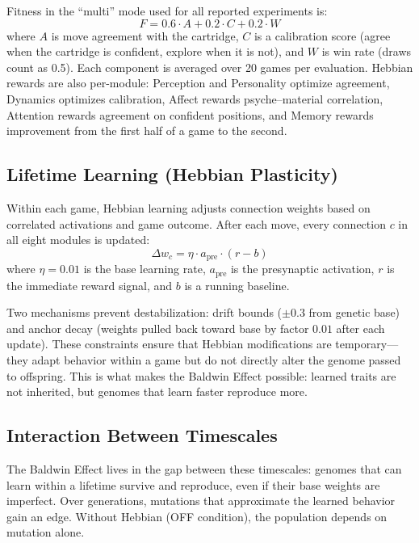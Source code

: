 \documentclass[11pt,a4paper]{article}
\begin{document}
Fitness in the ``multi'' mode used for all reported experiments is:
\begin{equation}
    F = 0.6 \cdot A + 0.2 \cdot C + 0.2 \cdot W
    \label{eq:fitness}
\end{equation}
where $A$ is move agreement with the cartridge, $C$ is a calibration score (agree when the cartridge is confident, explore when it is not), and $W$ is win rate (draws count as 0.5).
Each component is averaged over 20 games per evaluation.
Hebbian rewards are also per-module: Perception and Personality optimize agreement, Dynamics optimizes calibration, Affect rewards psyche--material correlation, Attention rewards agreement on confident positions, and Memory rewards improvement from the first half of a game to the second.

\subsection{Lifetime Learning (Hebbian Plasticity)}
\label{sec:hebbian}

Within each game, Hebbian learning adjusts connection weights based on correlated activations and game outcome.
After each move, every connection $c$ in all eight modules is updated:
\begin{equation}
    \Delta w_c = \eta \cdot a_{\text{pre}} \cdot (r - b)
    \label{eq:hebbian}
\end{equation}
where $\eta = 0.01$ is the base learning rate, $a_{\text{pre}}$ is the presynaptic activation, $r$ is the immediate reward signal, and $b$ is a running baseline.

Two mechanisms prevent destabilization: drift bounds ($\pm 0.3$ from genetic base) and anchor decay (weights pulled back toward base by factor $0.01$ after each update).
These constraints ensure that Hebbian modifications are temporary---they adapt behavior within a game but do not directly alter the genome passed to offspring.
This is what makes the Baldwin Effect possible: learned traits are not inherited, but genomes that learn faster reproduce more.

\subsection{Interaction Between Timescales}

The Baldwin Effect lives in the gap between these timescales: genomes that can learn within a lifetime survive and reproduce, even if their base weights are imperfect.
Over generations, mutations that approximate the learned behavior gain an edge.
Without Hebbian (OFF condition), the population depends on mutation alone.
\end{document}
